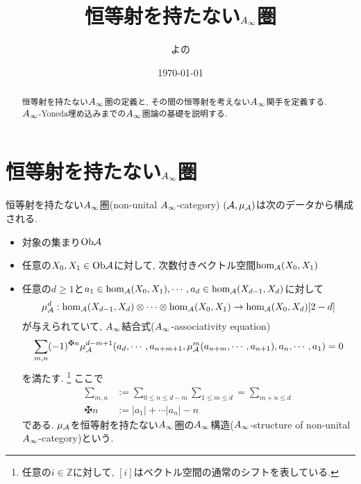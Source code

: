 \documentclass[uplatex, a4paper, 14Q, dvipdfmx]{jsarticle}
\title{恒等射を持たない\texorpdfstring{$A_{\infty}$}{Ainf}圏}
\author{よの}
\date{\today}
\begin{document}
\maketitle

\begin{abstract}
  恒等射を持たない$A_{\infty}$圏の定義と, その間の恒等射を考えない$A_{\infty}$関手を定義する.
  $A_{\infty}$-Yoneda埋め込みまでの$A_{\infty}$圏論の基礎を説明する. 
\end{abstract}

\tableofcontents

\section{恒等射を持たない\texorpdfstring{$A_{\infty}$}{Ainf}圏} \label{section_non_unital_Ainf_cat}

\begin{definition} \label{def_non_unital_Ainf_cat}
  恒等射を持たない$A_{\infty}$圏(non-unital $A_{\infty}$-category) $(\mathcal{A},\mu_{\mathcal{A}})$は次のデータから構成される. 
  \begin{itemize}
    \item 対象の集まり$\mathrm{Ob}\mathcal{A}$ 
    \item 任意の$X_0, X_1 \in \mathrm{Ob}\mathcal{A}$に対して, 次数付きベクトル空間$\hom_{\mathcal{A}}(X_0,X_1)$
    \item 任意の$d \geq 1$と$a_1 \in \hom_{\mathcal{A}}(X_0,X_1), \cdots, a_d \in \hom_{\mathcal{A}}(X_{d-1},X_d)$に対して
    \begin{align*}
      \mu^d_{\mathcal{A}} : \hom_{\mathcal{A}}(X_{d-1},X_d) \otimes \cdots \otimes \hom_{\mathcal{A}}(X_0,X_1) \to \hom_{\mathcal{A}}(X_0,X_d)[2-d]
    \end{align*}
    が与えられていて, $A_{\infty}$結合式($A_{\infty}$-associativity equation) 
    \begin{align*}
      \sum_{m,n} (-1)^{\maltese n} \mu^{d-m+1}_\A(a_d,\cdots,a_{n+m+1}, \mu^m_\A(a_{n+m},\cdots,a_{n+1}), a_n,\cdots,a_1)
      = 0
    \end{align*}
    を満たす.
    \footnote{
      任意の$i \in \mathbb{Z}$に対して, $[i]$はベクトル空間の通常のシフトを表している.
    }
    ここで
    \begin{align*}
      \sum_{m,n} &:= \sum_{0 \leq n \leq d-m} \sum_{1 \leq m \leq d} = \sum_{m+n \leq d} \\
      \maltese n &:= |a_1| + \cdots |a_n| - n
    \end{align*}
    である. 
    $\mu_{\mathcal{A}}$を恒等射を持たない$A_{\infty}$圏の$A_{\infty}$構造($A_{\infty}$-structure of non-unital $A_{\infty}$-category)という. 
  \end{itemize}
\end{definition}
\end{document}
